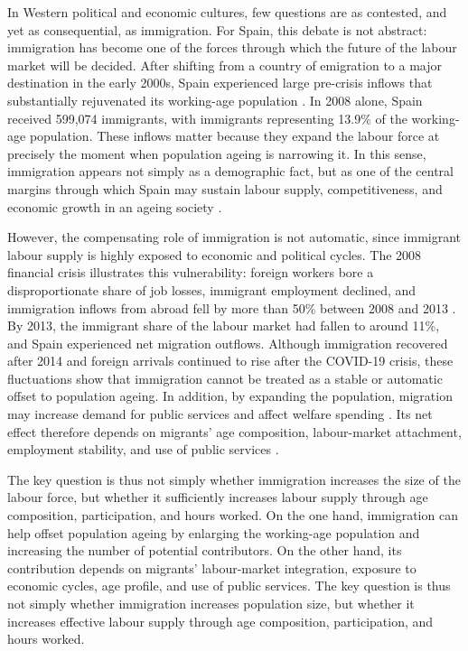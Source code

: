 In Western political and economic cultures, few questions are as contested, and yet as consequential, as immigration. For Spain, this debate is not abstract: immigration has become one of the forces through which the future of the labour market will be decided. After shifting from a country of emigration to a major destination in the early 2000s, Spain experienced large pre-crisis inflows that substantially rejuvenated its working-age population \parencite{amuedo2008complements,arango2013exceptional,gonzalez2011very}. In 2008 alone, Spain received 599,074 immigrants, with immigrants representing 13.9\% of the working-age population. These inflows matter because they expand the labour force at precisely the moment when population ageing is narrowing it. In this sense, immigration appears not simply as a demographic fact, but as one of the central margins through which Spain may sustain labour supply, competitiveness, and economic growth in an ageing society \parencite{stepanek2022sectoral,okamoto2021immigration,united2000replacement,casares2018labor}.

\vspace{0.7em}\par
However, the compensating role of immigration is not automatic, since immigrant labour supply is highly exposed to economic and political cycles. The 2008 financial crisis illustrates this vulnerability: foreign workers bore a disproportionate share of job losses, immigrant employment declined, and immigration inflows from abroad fell by more than 50\% between 2008 and 2013 \parencite{rodriguez2016labor}. By 2013, the immigrant share of the labour market had fallen to around 11\%, and Spain experienced net migration outflows. Although immigration recovered after 2014 and foreign arrivals continued to rise after the COVID-19 crisis, these fluctuations show that immigration cannot be treated as a stable or automatic offset to population ageing. In addition, by expanding the population, migration may increase demand for public services and affect welfare spending \parencite{fiorio2023migration,naumann2021population}. Its net effect therefore depends on migrants' age composition, labour-market attachment, employment stability, and use of public services \parencite{preston2014effect}.

\vspace{0.7em}\par
The key question is thus not simply whether immigration increases the size of the labour force, but whether it sufficiently increases labour supply through age composition, participation, and hours worked. On the one hand, immigration can help offset population ageing by enlarging the working-age population and increasing the number of potential contributors. On the other hand, its contribution depends on migrants' labour-market integration, exposure to economic cycles, age profile, and use of public services. The key question is thus not simply whether immigration increases population size, but whether it increases effective labour supply through age composition, participation, and hours worked.

